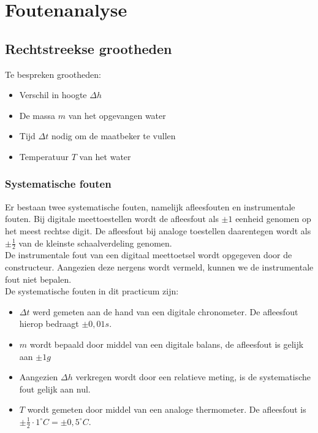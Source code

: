 \section{Foutenanalyse}

\subsection{Rechtstreekse grootheden}

Te bespreken grootheden:
\begin{itemize}
    \item Verschil in hoogte $\Delta h$
    \item De massa $m$ van het opgevangen water
    \item Tijd $\Delta t$ nodig om de maatbeker te vullen
    \item Temperatuur $T$ van het water
\end{itemize}

\subsubsection{Systematische fouten}
Er bestaan twee systematische fouten, namelijk afleesfouten en
instrumentale fouten. Bij digitale meettoestellen wordt de afleesfout
als $\pm 1$ eenheid genomen op het meest rechtse digit. 
De afleesfout bij analoge toestellen daarentegen wordt
als $\pm\frac{1}{2}$ van de kleinste schaalverdeling genomen. 
\\

De instrumentale fout van een digitaal meettoetsel wordt opgegeven
door de constructeur. Aangezien deze nergens wordt vermeld,
kunnen we de instrumentale fout niet bepalen.
\\

De systematische fouten in dit practicum zijn:

\begin{itemize}
    \item $\Delta t$ werd gemeten aan de hand van een digitale chronometer. De afleesfout hierop bedraagt $\pm 0,01 s$.
    \item $m$ wordt bepaald door middel van een digitale balans, de afleesfout is gelijk aan $\pm 1g$
    \item Aangezien $\Delta h$ verkregen wordt door een relatieve meting, is de systematische fout gelijk aan nul.
    \item $T$ wordt gemeten door middel van een analoge thermometer. De afleesfout is $\pm \frac{1}{2} \cdot 1^{\circ}C = \pm 0,5^{\circ}C$.
\end{itemize} 

